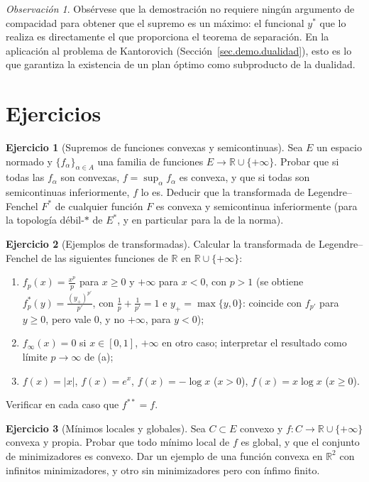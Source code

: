 \documentclass[12pt, a4paper]{amsbook}
\newcommand{\R}{{\mathbb R}}
\theoremstyle{remark}
\newtheorem{obs}[teo]{Observación}
\theoremstyle{definition}
\newtheorem{ejercicio}{Ejercicio}[chapter]
\numberwithin{section}{chapter}
\numberwithin{subsection}{section}
\numberwithin{equation}{section}
\numberwithin{figure}{chapter}
\begin{document}
\begin{obs}
Obsérvese que la demostración no requiere ningún argumento de compacidad para
obtener que el supremo es un máximo: el funcional $y^*$ que lo realiza es
directamente el que proporciona el teorema de separación. En la aplicación al
problema de Kantorovich (Sección~\ref{sec.demo.dualidad}), esto es lo que
garantiza la existencia de un plan óptimo como subproducto de la dualidad.
\end{obs}


\section*{Ejercicios}

\begin{ejercicio}[Supremos de funciones convexas y semicontinuas]\label{ejer.FR.sup}
Sea $E$ un espacio normado y $\{f_\alpha\}_{\alpha\in A}$ una familia de
funciones $E\to\R\cup\{+\infty\}$. Probar que si todas las $f_\alpha$ son
convexas, $f=\sup_\alpha f_\alpha$ es convexa, y que si todas son
semicontinuas inferiormente, $f$ lo es. Deducir que la transformada de
Legendre--Fenchel $F^*$ de cualquier función $F$ es convexa y semicontinua
inferiormente (para la topología débil-$*$ de $E^*$, y en particular para la
de la norma).
\end{ejercicio}

\begin{ejercicio}[Ejemplos de transformadas]\label{ejer.FR.ejemplos}
Calcular la transformada de Legen\-dre--Fenchel de las siguientes funciones
de $\R$ en $\R\cup\{+\infty\}$:
\begin{enumerate}[label=(\alph*)]
\item $f_p(x)=\frac{x^p}{p}$ para $x\ge0$ y $+\infty$ para $x<0$, con $p>1$
(se obtiene $f_p^*(y)=\frac{(y_+)^{p'}}{p'}$, con $\frac1p+\frac1{p'}=1$ e
$y_+=\max\{y,0\}$: coincide con $f_{p'}$ para $y\ge0$, pero vale $0$, y no
$+\infty$, para $y<0$);
\item $f_\infty(x)=0$ si $x\in[0,1]$, $+\infty$ en otro caso; interpretar el
resultado como límite $p\to\infty$ de (a);
\item $f(x)=|x|$, $f(x)=e^x$, $f(x)=-\log x$ ($x>0$), $f(x)=x\log x$ ($x\ge0$).
\end{enumerate}
Verificar en cada caso que $f^{**}=f$.
\end{ejercicio}

\begin{ejercicio}[Mínimos locales y globales]\label{ejer.FR.minimo}
Sea $C\subset E$ convexo y $f\colon C\to\R\cup\{+\infty\}$ convexa y propia.
Probar que todo mínimo local de $f$ es global, y que el conjunto de
minimizadores es convexo. Dar un ejemplo de una función convexa en $\R^2$
con infinitos minimizadores, y otro sin minimizadores pero con ínfimo finito.
\end{ejercicio}
\end{document}

